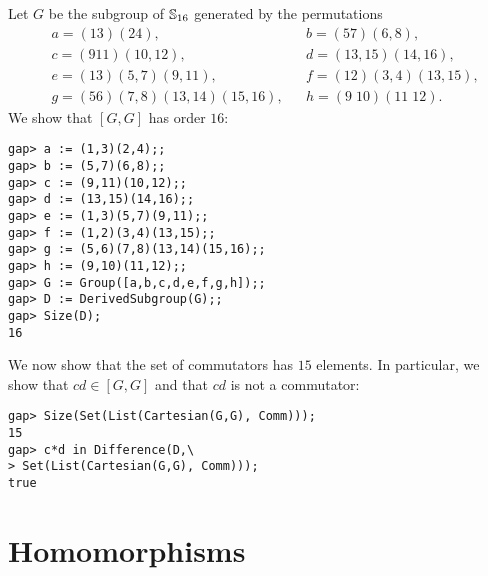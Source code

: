 \begin{example}
Let $G$ be the
subgroup of $\mathbb{S}_{16}$ generated by the permutations
\begin{align*}
&a = (13)(24),&&
b = (57)(6,8),\\
&c = (911)(10,12),&&
d = (13,15)(14,16),\\
&e = (13)(5,7)(9,11),&&
f = (12)(3,4)(13,15),\\
&g = (56)(7,8)(13,14)(15,16),&&
h = (9\;10)(11\;12).
\end{align*}
We show that $[G,G]$ has order $16$: 
\begin{lstlisting}
gap> a := (1,3)(2,4);;
gap> b := (5,7)(6,8);;
gap> c := (9,11)(10,12);;
gap> d := (13,15)(14,16);;
gap> e := (1,3)(5,7)(9,11);;
gap> f := (1,2)(3,4)(13,15);;
gap> g := (5,6)(7,8)(13,14)(15,16);;
gap> h := (9,10)(11,12);;
gap> G := Group([a,b,c,d,e,f,g,h]);;
gap> D := DerivedSubgroup(G);;
gap> Size(D);
16
\end{lstlisting}
We now show that the set of commutators 
has $15$ elements. In particular, we show that 
$cd\in[G,G]$ and that $cd$ is not a commutator: 
\begin{lstlisting}
gap> Size(Set(List(Cartesian(G,G), Comm)));
15
gap> c*d in Difference(D,\
> Set(List(Cartesian(G,G), Comm)));
true
\end{lstlisting}
\end{example}


\section{Homomorphisms}

